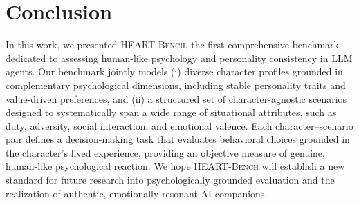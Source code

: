 \documentclass{article}
\newcommand{\ourbench}[0]{\textsc{HEART-Bench}\xspace}
\begin{document}
\section{Conclusion}
In this work, we presented \ourbench, the first comprehensive benchmark dedicated to assessing human-like psychology and personality consistency in LLM agents. Our benchmark jointly models (i) diverse character profiles grounded in complementary psychological dimensions, including stable personality traits and value-driven preferences, and (ii) a structured set of character-agnostic scenarios designed to systematically span a wide range of situational attributes, such as duty, adversity, social interaction, and emotional valence. Each character–scenario pair defines a decision-making task that evaluates behavioral choices grounded in the character's lived experience, providing an objective measure of genuine, human-like psychological reaction. We hope \ourbench will establish a new standard for future research into psychologically grounded evaluation and the realization of authentic, emotionally resonant AI companions.

\clearpage


\newpage

\clearpage
\appendix

\end{document}
